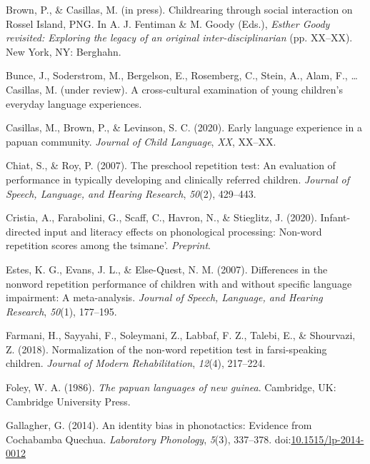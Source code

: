 \documentclass[english,,man,floatsintext]{apa6}
\begin{document}
\hypertarget{ref-brownIPchildrearing}{}
Brown, P., \& Casillas, M. (in press). Childrearing through social
interaction on Rossel Island, PNG. In A. J. Fentiman \& M. Goody (Eds.),
\emph{Esther Goody revisited: Exploring the legacy of an original
inter-disciplinarian} (pp. XX--XX). New York, NY: Berghahn.

\hypertarget{ref-bunceURcrosscultural}{}
Bunce, J., Soderstrom, M., Bergelson, E., Rosemberg, C., Stein, A.,
Alam, F., \ldots{} Casillas, M. (under review). A cross-cultural
examination of young children's everyday language experiences.

\hypertarget{ref-casillas2020early}{}
Casillas, M., Brown, P., \& Levinson, S. C. (2020). Early language
experience in a papuan community. \emph{Journal of Child Language},
\emph{XX}, XX--XX.

\hypertarget{ref-chiat2007preschool}{}
Chiat, S., \& Roy, P. (2007). The preschool repetition test: An
evaluation of performance in typically developing and clinically
referred children. \emph{Journal of Speech, Language, and Hearing
Research}, \emph{50}(2), 429--443.

\hypertarget{ref-cristia2020infant}{}
Cristia, A., Farabolini, G., Scaff, C., Havron, N., \& Stieglitz, J.
(2020). Infant-directed input and literacy effects on phonological
processing: Non-word repetition scores among the tsimane'.
\emph{Preprint}.

\hypertarget{ref-estes2007differences}{}
Estes, K. G., Evans, J. L., \& Else-Quest, N. M. (2007). Differences in
the nonword repetition performance of children with and without specific
language impairment: A meta-analysis. \emph{Journal of Speech, Language,
and Hearing Research}, \emph{50}(1), 177--195.

\hypertarget{ref-farmani2018normalization}{}
Farmani, H., Sayyahi, F., Soleymani, Z., Labbaf, F. Z., Talebi, E., \&
Shourvazi, Z. (2018). Normalization of the non-word repetition test in
farsi-speaking children. \emph{Journal of Modern Rehabilitation},
\emph{12}(4), 217--224.

\hypertarget{ref-foley1986papuan}{}
Foley, W. A. (1986). \emph{The papuan languages of new guinea}.
Cambridge, UK: Cambridge University Press.

\hypertarget{ref-gallagher2014identity}{}
Gallagher, G. (2014). An identity bias in phonotactics: Evidence from
Cochabamba Quechua. \emph{Laboratory Phonology}, \emph{5}(3), 337--378.
doi:\href{https://doi.org/10.1515/lp-2014-0012}{10.1515/lp-2014-0012}
\end{document}
